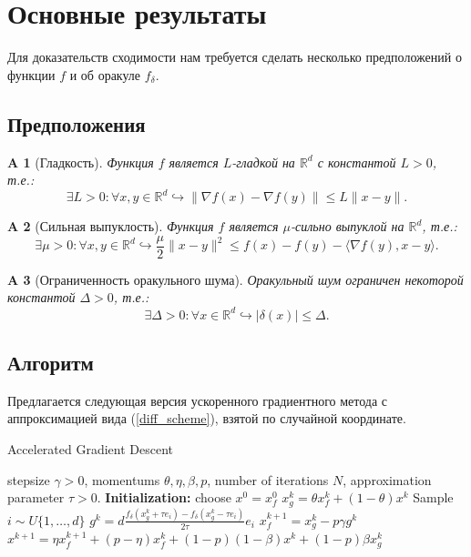 \documentclass{article}
\newtheorem{assumption}{A}
\newcommand{\R}{\mathbb{R}}
\begin{document}
\section{Основные результаты}
Для доказательств сходимости нам требуется сделать несколько предположений о функции $f$ и об оракуле $f_\delta$.
\subsection{Предположения}
\begin{assumption}[Гладкость]\label{A1}
 Функция $f$ является $L$-гладкой на $\R^d$ с константой $L > 0$, т.е.:
 \begin{equation}
  \exists L > 0: \forall x, y \in \R^d \hookrightarrow \|\nabla f(x) - \nabla f(y)\| \leqslant L \|x - y\|.
  \label{l_smoothness}
 \end{equation}
\end{assumption}

\begin{assumption}[Сильная выпуклость]\label{A2}
 Функция $f$ является $ \mu$-сильно выпуклой на $\R^d$, т.е.:
 \begin{equation}
  \exists \mu > 0: \forall x, y \in \R^d \hookrightarrow \frac{\mu}{2}\|x - y\|^2 \leqslant f(x) - f(y) - \langle \nabla f(y), x - y \rangle.
  \label{mu_strongly_convexity}
 \end{equation}
\end{assumption}


\begin{assumption}[Ограниченность оракульного шума]\label{A3}
 Оракульный шум ограничен некоторой константой $\Delta > 0$, т.е.:
 \begin{equation}
  \exists \Delta > 0: \forall x \in \R^d \hookrightarrow |\delta(x)| \leqslant \Delta.
  \label{bounded_oracle_noise}
 \end{equation}
\end{assumption}


\subsection{Алгоритм}
Предлагается следующая версия ускоренного градиентного метода с аппроксимацией вида (\ref{diff_scheme}), взятой по случайной координате.
\begin{algorithm}[!ht]
\caption{ Accelerated Gradient Descent }\label{agd_algorithm}
\begin{algorithmic}[1]
   \REQUIRE stepsize $\gamma > 0$, momentums $\theta, \eta, \beta, p$, number of iterations $N$, approximation parameter $\tau > 0$.
   \textbf{Initialization:} choose $x^0 = x_f^0$
		\STATE $x_g^k = \theta x_f^k + (1 - \theta)x^k$
		\STATE Sample $i \sim U\{1, \dots, d\}$
		\STATE $g^k = d\frac{f_\delta(x_g^k + \tau e_i) - f_\delta(x_g^k - \tau e_i)}{2\tau}e_i$
		\STATE $x_f^{k + 1} = x_g^k - p \gamma g^k$
		\STATE $x^{k + 1} = \eta x_f^{k + 1} + (p - \eta) x_f^k + (1 - p)(1 - \beta) x^k + (1 - p)\beta x_g^k$
   \ENDFOR
\end{algorithmic}
\end{algorithm}
\end{document}
